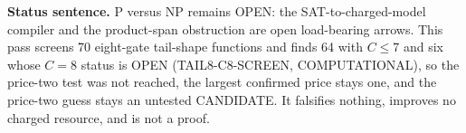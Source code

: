 \documentclass[11pt]{article}
\begin{document}
\bigskip
\noindent\textbf{Status sentence.} P versus NP remains OPEN: the SAT-to-charged-model compiler and the product-span obstruction are open load-bearing arrows. This pass screens 70 eight-gate tail-shape functions and finds 64 with $C\le7$ and six whose $C=8$ status is OPEN (TAIL8-C8-SCREEN, COMPUTATIONAL), so the price-two test was not reached, the largest confirmed price stays one, and the price-two guess stays an untested CANDIDATE. It falsifies nothing, improves no charged resource, and is not a proof.
\end{document}
